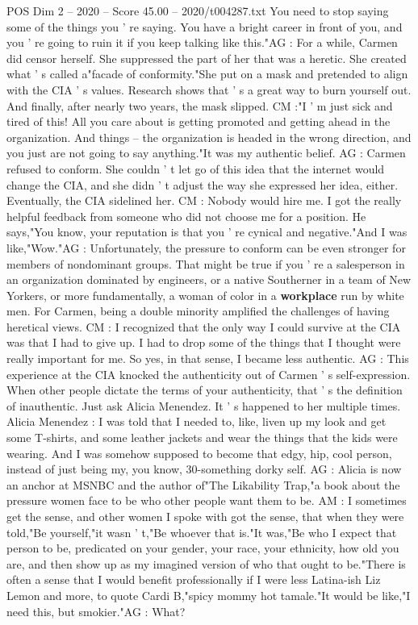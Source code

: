 \begin{textsample}{POS Dim 2 – 2020 – Score 45.00 – 2020/t004287.txt}
You need to stop saying some of the things you ' re saying.
You have a bright career in front of you, and you ' re going to ruin it if you keep talking like this."AG : For a while, Carmen did censor herself.
She suppressed the part of her that was a heretic.
She created what ' s called a"facade of conformity."She put on a mask and pretended to align with the CIA ' s values.
Research shows that ' s a great way to burn yourself out.
And finally, after nearly two years, the mask slipped.
CM :"I ' m just sick and tired of this!
All you care about is getting promoted and getting ahead in the organization.
And things -- the organization is headed in the wrong direction, and you just are not going to say anything."It was my authentic belief.
AG : Carmen refused to conform.
She couldn ' t let go of this idea that the internet would change the CIA, and she didn ' t adjust the way she expressed her idea, either.
Eventually, the CIA sidelined her.
CM : Nobody would hire me.
I got the really helpful feedback from someone who did not choose me for a position.
He says,"You know, your reputation is that you ' re cynical and negative."And I was like,"Wow."AG : Unfortunately, the pressure to conform can be even stronger for members of nondominant groups.
That might be true if you ' re a salesperson in an organization dominated by engineers, or a native Southerner in a team of New Yorkers, or more fundamentally, a woman of color in a \textbf{workplace} run by white men.
For Carmen, being a double minority amplified the challenges of having heretical views.
CM : I recognized that the only way I could survive at the CIA was that I had to give up.
I had to drop some of the things that I thought were really important for me.
So yes, in that sense, I became less authentic.
AG : This experience at the CIA knocked the authenticity out of Carmen ' s self-expression.
When other people dictate the terms of your authenticity, that ' s the definition of inauthentic.
Just ask Alicia Menendez.
It ' s happened to her multiple times.
Alicia Menendez : I was told that I needed to, like, liven up my look and get some T-shirts, and some leather jackets and wear the things that the kids were wearing.
And I was somehow supposed to become that edgy, hip, cool person, instead of just being my, you know, 30-something dorky self.
AG : Alicia is now an anchor at MSNBC and the author of"The Likability Trap,"a book about the pressure women face to be who other people want them to be.
AM : I sometimes get the sense, and other women I spoke with got the sense, that when they were told,"Be yourself,"it wasn ' t,"Be whoever that is."It was,"Be who I expect that person to be, predicated on your gender, your race, your ethnicity, how old you are, and then show up as my imagined version of who that ought to be."There is often a sense that I would benefit professionally if I were less Latina-ish Liz Lemon and more, to quote Cardi B,"spicy mommy hot tamale."It would be like,"I need this, but smokier."AG : What?

\end{textsample}
